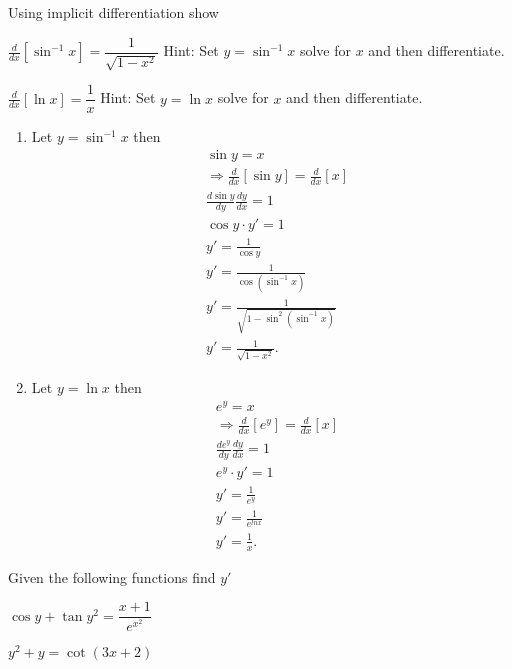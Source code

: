 \documentclass{hwset}
\begin{document}
\begin{problem}[3.]
	Using implicit differentiation show
	\be
		\item $\frac{d}{dx}\left[\sin^{-1} x\right] = \dfrac{1}{\sqrt{1 - x^2}}$
		Hint: Set $y=\sin^{-1} x$ solve for $x$ and then differentiate.
		\item $\frac{d}{dx} \left[\ln x\right] = \dfrac{1}{x}$ 
		Hint: Set $y=\ln x$ solve for $x$ and then differentiate.
	\ee
\end{problem}

\begin{enumerate}
	\item \begin{solution}
		Let $y=\sin^{-1} x$ then 
		\begin{align*}
			&\sin y = x \\
			&\Rightarrow\frac{d}{dx}\left[\sin y \right] = \frac{d}{dx}\left[ x \right]\\
			&\frac{d\sin y}{dy}\frac{dy}{dx} = 1 \\
			&\cos y \cdot y' = 1 \\
			&y' = \frac{1}{\cos y}  \\
			&y' = \frac{1}{\cos (\sin^{-1} x)}  \\
			&y' = \frac{1}{\sqrt{1 - \sin^2 (\sin^{-1} x)}}  \\
			&\boxed{y' = \frac{1}{\sqrt{1 - x^2}}}.
		\end{align*}
	\end{solution}
	\item \begin{solution} Let $y = \ln x$ then
		\begin{align*}
			&e^y = x\\
			&\Rightarrow \frac{d}{dx}\left[ e^y \right] = \frac{d}{dx}\left[ x \right] \\
			&\frac{de^y}{dy}\frac{dy}{dx} = 1 \\
			&e^y\cdot y' = 1 \\
			&y' = \frac{1}{e^y} \\
			&y' = \frac{1}{e^{ln x}} \\
			&\boxed{y' = \frac{1}{x}}.
		\end{align*}
	\end{solution}
\end{enumerate}

\begin{problem}[4.] 
	Given the following functions find $y'$
	\be
		\item $\cos y + \tan y^2 = \dfrac{x+1}{e^{x^2}}$
		\item $y^2 + y = \cot(3x +2)$
	\ee
\end{problem}
\end{document}
